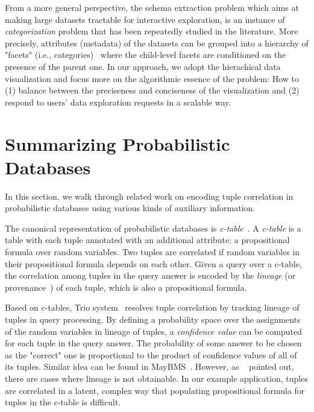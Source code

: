From a more general perspective, the schema extraction problem which aims at making large datasets tractable for interactive exploration, is an instance of \textit{categorization} problem that has been repeatedly studied in the literature.
More precisely, attributes (metadata) of the datasets can be grouped into a hierarchy of "facets" (i.e., categories)~\cite{Smith:2006:FSS:1187627.1187785} where the child-level facets are conditioned on the presence of the parent one.
In our approach, we adopt the hierachical data visualization and focus more on the algorithmic essence of the problem: How to (1) balance between the preciseness and conciseness of the visualization and (2) respond to users' data exploration requests in a scalable way.

\section{Summarizing Probabilistic Databases}
In this section, we walk through related work on encoding tuple correlation in probabilistic databases using various kinds of auxiliary information.

The canonical representation of probabilistic databases is \emph{c-table}~\cite{suciu2009probabilistic}.
A \emph{c-table} is a table with each tuple annotated with an additional attribute: a propositional formula over random variables. 
Two tuples are correlated if random variables in their propositional formula depends on each other.
Given a query over a c-table, the correlation among tuples in the query answer is encoded by the \emph{lineage} (or provenance~\cite{cui2003lineage}) of each tuple, which is also a propositional formula.

Based on c-tables, Trio system~\cite{benjelloun2006uldbs} resolves tuple correlation by tracking lineage of tuples in query processing.
By defining a probability space over the assignments of the random variables in lineage of tuples, a \emph{confidence value} can be computed for each tuple in the query answer.
The probability of some answer to be chosen as the "correct" one is proportional to the product of confidence values of all of its tuples.
Similar idea can be found in MayBMS~\cite{Huang:2009:MPD:1559845.1559984}.
However, as ~\cite{re2007materialized} pointed out, there are cases where lineage is not obtainable.
In our example application, tuples are correlated in a latent, complex way that populating propositional formula for tuples in the c-table is difficult.  

